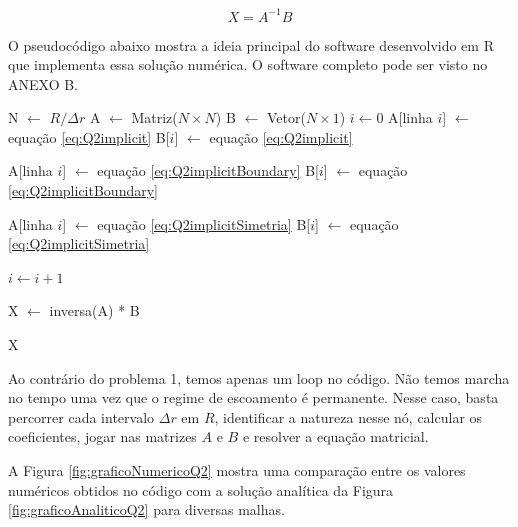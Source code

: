 \begin{equation}\label{eq:Q2sistemalinear}
    X = A^{-1} B
\end{equation}

O pseudocódigo abaixo mostra a ideia principal do software desenvolvido em R que implementa
essa solução numérica. O software completo pode ser visto no ANEXO B.

\begin{algorithmic}
    \State N $\gets$ $R / \Delta r$
    \State A $\gets$ Matriz($N \times N$)
    \State B $\gets$ Vetor($N \times 1$)
    \State $i \gets 0$
            \State A[linha $i$] $\gets$ equação \eqref{eq:Q2implicit}
            \State B[$i$] $\gets$ equação \eqref{eq:Q2implicit}
        \EndIf

            \State A[linha $i$] $\gets$ equação \eqref{eq:Q2implicitBoundary}
            \State B[$i$] $\gets$ equação \eqref{eq:Q2implicitBoundary}
        \EndIf

            \State A[linha $i$] $\gets$ equação \eqref{eq:Q2implicitSimetria}
            \State B[$i$] $\gets$ equação \eqref{eq:Q2implicitSimetria}
        \EndIf

        \State $i \gets i + 1$
    \EndFor

    \State X $\gets$ inversa(A) * B

    \Return X
\end{algorithmic}

Ao contrário do problema 1, temos apenas um loop no código. Não temos marcha no tempo uma vez
que o regime de escoamento é permanente. Nesse caso, basta percorrer cada intervalo
$\Delta r$ em $R$, identificar a natureza nesse nó, calcular os coeficientes, jogar nas matrizes
$A$ e $B$ e resolver a equação matricial.

A Figura \ref*{fig:graficoNumericoQ2} mostra uma comparação entre os valores numéricos obtidos no código 
com a solução analítica da Figura \ref*{fig:graficoAnaliticoQ2} para diversas malhas.

